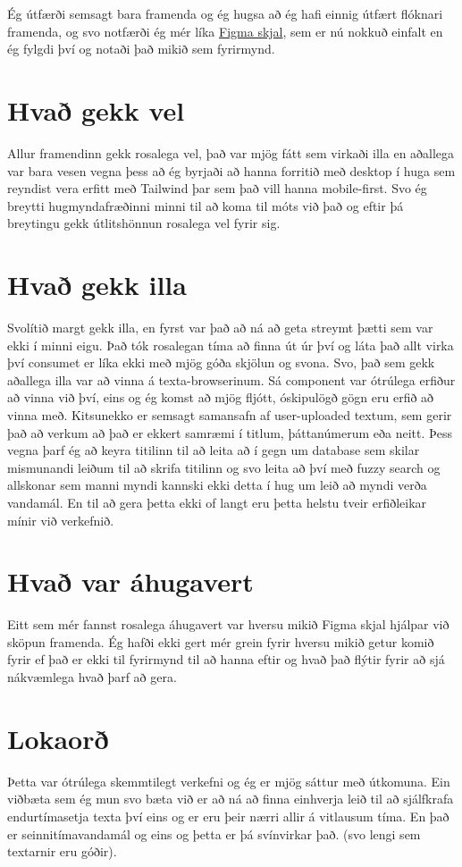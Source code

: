 \documentclass{article}
\begin{document}
	Ég útfærði semsagt bara framenda og ég hugsa að ég hafi einnig útfært flóknari framenda, og svo notfærði ég mér líka \href{https://www.figma.com/design/AH3i5YjtNi5afQ72QmelZ6/Untitled?node-id=0-1&t=3JF5reaVuTWhW4Yw-1}{Figma skjal}, sem er nú nokkuð einfalt en 
ég fylgdi því og notaði það mikið sem fyrirmynd.

	\section{Hvað gekk vel}

	Allur framendinn gekk rosalega vel, það var mjög fátt sem virkaði illa en aðallega var bara vesen vegna þess að ég byrjaði að hanna forritið með desktop í 
	huga sem reyndist vera erfitt með Tailwind þar sem það vill hanna mobile-first. Svo ég breytti hugmyndafræðinni minni til að koma til móts við það og eftir 
	þá breytingu gekk útlitshönnun rosalega vel fyrir sig.

	\section{Hvað gekk illa}

	Svolítið margt gekk illa, en fyrst var það að ná að geta streymt þætti sem var ekki í minni eigu. Það tók rosalegan tíma að finna út úr því og láta það allt 
	virka því consumet er líka ekki með mjög góða skjölun og svona. Svo, það sem gekk aðallega illa var að vinna á texta-browserinum. Sá component var ótrúlega 
	erfiður að vinna við því, eins og ég komst að mjög fljótt, óskipulögð gögn eru erfið að vinna með. Kitsunekko er semsagt samansafn af user-uploaded textum, 
	sem gerir það að verkum að það er ekkert samræmi í titlum, þáttanúmerum eða neitt. Þess vegna þarf ég að keyra titilinn til að leita að í gegn um database sem 
	skilar mismunandi leiðum til að skrifa titilinn og svo leita að því með fuzzy search og allskonar sem manni myndi kannski ekki detta í hug um leið að myndi 
	verða vandamál. En til að gera þetta ekki of langt eru þetta helstu tveir erfiðleikar mínir við verkefnið.

	\section{Hvað var áhugavert}

	Eitt sem mér fannst rosalega áhugavert var hversu mikið Figma skjal hjálpar við sköpun framenda. Ég hafði ekki gert mér grein fyrir hversu mikið getur 
	komið fyrir ef það er ekki til fyrirmynd til að hanna eftir og hvað það flýtir fyrir að sjá nákvæmlega hvað þarf að gera.

	\section{Lokaorð}

	Þetta var ótrúlega skemmtilegt verkefni og ég er mjög sáttur með útkomuna. Ein viðbæta sem ég mun svo bæta við er að ná að finna einhverja leið til að 
	sjálfkrafa endurtímasetja texta því eins og er eru þeir nærri allir á vitlausum tíma. En það er seinnitímavandamál og eins og þetta er þá svínvirkar það. (svo 
	lengi sem textarnir eru góðir).


	
\end{document}
